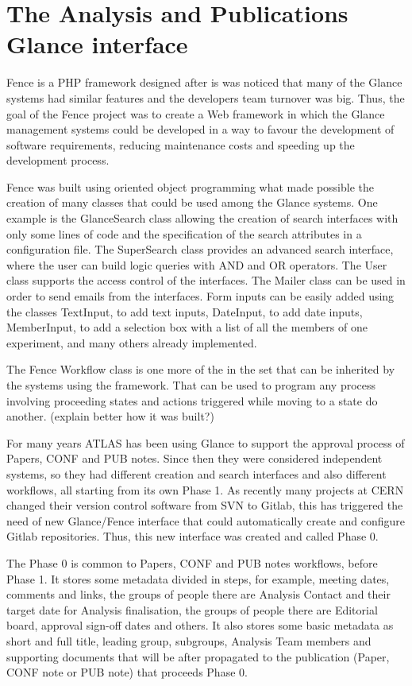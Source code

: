 \section{The Analysis and Publications Glance interface}%
\label{sec:anaglance}
Fence is a PHP framework designed after is was noticed that many of the Glance systems had similar features and the developers team turnover was big. Thus, the goal of the Fence project was to create a Web framework in which the Glance management systems could be developed in a way to favour the development of software requirements, reducing maintenance costs and speeding up the development process.

Fence was built using oriented object programming what made possible the creation of many classes that could be used among the Glance systems. One example is the GlanceSearch class allowing the creation of search interfaces with only some lines of code and the specification of the search attributes in a configuration file. The SuperSearch class provides an advanced search interface, where the user can build logic queries with AND and OR operators. The User class supports the access control of the interfaces. The Mailer class can be used in order to send emails from the interfaces. Form inputs can be easily added using the classes TextInput, to add text inputs, DateInput, to add date inputs, MemberInput, to add a selection box with a list of all the members of one experiment, and many others already implemented.

The Fence Workflow class is one more of the in the set that can be inherited by the systems using the framework. That can be used to program any process involving proceeding states and actions triggered while moving to a state do another. (explain better how it was built?)

For many years ATLAS has been using Glance to support the approval process of Papers, CONF and PUB notes. Since then they were considered independent systems, so they had different creation and search interfaces and also different workflows, all starting from its own Phase 1. As recently many projects at CERN changed their version control software from SVN to Gitlab, this has triggered the need of new Glance/Fence interface that could automatically create and configure Gitlab repositories. Thus, this new interface was created and called Phase 0.

The Phase 0 is common to Papers, CONF and PUB notes workflows, before Phase 1. It stores some metadata divided in steps, for example, meeting dates, comments and links, the groups of people there are Analysis Contact and their target date for Analysis finalisation, the groups of people there are Editorial board, approval sign-off dates and others. It also stores some basic metadata as short and full title, leading group, subgroups, Analysis Team members and supporting documents that will be after propagated to the publication (Paper, CONF note or PUB note) that proceeds Phase 0.

